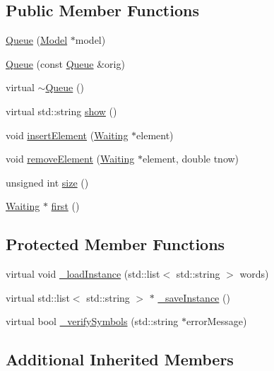 \subsection*{Public Member Functions}
\begin{DoxyCompactItemize}
\item 
\hyperlink{class_queue_a67994e94c7d825b421a188c6b76f4014}{Queue} (\hyperlink{class_model}{Model} $\ast$model)
\item 
\hyperlink{class_queue_a09f908d6edb810d86871bda50fdf4bac}{Queue} (const \hyperlink{class_queue}{Queue} \&orig)
\item 
virtual \hyperlink{class_queue_a00d119db8fa3050da37746e82cbcf94f}{$\sim$\-Queue} ()
\item 
virtual std\-::string \hyperlink{class_queue_ac78cc84cd91539c7f38d95dc17dabac5}{show} ()
\item 
void \hyperlink{class_queue_a961b5b7ca80317aa69f958612fb988ad}{insert\-Element} (\hyperlink{class_waiting}{Waiting} $\ast$element)
\item 
void \hyperlink{class_queue_a114d5144b3026b57cca9cf481b1f0d65}{remove\-Element} (\hyperlink{class_waiting}{Waiting} $\ast$element, double tnow)
\item 
unsigned int \hyperlink{class_queue_a4cd92f99b7abc9ec4df32690dc5a037d}{size} ()
\item 
\hyperlink{class_waiting}{Waiting} $\ast$ \hyperlink{class_queue_a39a1f5a1733f61634339ecee7aac7907}{first} ()
\end{DoxyCompactItemize}
\subsection*{Protected Member Functions}
\begin{DoxyCompactItemize}
\item 
virtual void \hyperlink{class_queue_ac722922c7cac47ed74502c2d7206c074}{\-\_\-load\-Instance} (std\-::list$<$ std\-::string $>$ words)
\item 
virtual std\-::list$<$ std\-::string $>$ $\ast$ \hyperlink{class_queue_a9245790264a9d68030ae8bd884c85bcf}{\-\_\-save\-Instance} ()
\item 
virtual bool \hyperlink{class_queue_a81f6676597a7974af394ddd3f67c7926}{\-\_\-verify\-Symbols} (std\-::string $\ast$error\-Message)
\end{DoxyCompactItemize}
\subsection*{Additional Inherited Members}


